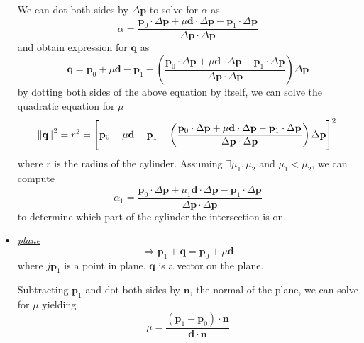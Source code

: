 \documentclass[twocolumn,landscape,10pt]{article}
\theoremstyle{definition}
\begin{document}
\begin{itemize}
        We can dot both sides by $\Delta\mathbf{p}$ to solve for $\alpha$ as
        \[
            \alpha=\frac{\mathbf{p}_0\cdot\Delta\mathbf{p}+\mu\mathbf{d}\cdot\Delta\mathbf{p}-\mathbf{p}_1\cdot\Delta\mathbf{p}}
            {\Delta\mathbf{p}\cdot\Delta\mathbf{p}}
        \]
        and obtain expression for $\mathbf{q}$ as
        \[
            \mathbf{q}=\mathbf{p}_0+\mu\mathbf{d}-\mathbf{p}_1-
            \left(\frac{\mathbf{p}_0\cdot\Delta\mathbf{p}+\mu\mathbf{d}\cdot\Delta\mathbf{p}-\mathbf{p}_1\cdot\Delta\mathbf{p}}
            {\Delta\mathbf{p}\cdot\Delta\mathbf{p}}\right)
            \Delta\mathbf{p}
        \]
        by dotting both sides of the above equation by itself,
        we can solve the quadratic equation for $\mu$
        \[
            \norm{\mathbf{q}}^2=r^2
            ={\left[\mathbf{p}_0+\mu\mathbf{d}-\mathbf{p}_1-
            \left(\frac{\mathbf{p}_0\cdot\Delta\mathbf{p}+\mu\mathbf{d}\cdot\Delta\mathbf{p}-\mathbf{p}_1\cdot\Delta\mathbf{p}}
            {\Delta\mathbf{p}\cdot\Delta\mathbf{p}}\right)
            \Delta\mathbf{p}\right]}^{2}
        \]
        where $r$ is the radius of the cylinder.
        Assuming $\exists\mu_1,\mu_2$ and $\mu_1<\mu_2$, 
        we can compute
        \[
            \alpha_1=\frac{\mathbf{p}_0\cdot\Delta\mathbf{p}+\mu_1\mathbf{d}\cdot\Delta\mathbf{p}-\mathbf{p}_1\cdot\Delta\mathbf{p}}
            {\Delta\mathbf{p}\cdot\Delta\mathbf{p}}
        \]
        to determine which part of the cylinder the intersection is on.

    \item \underline{\emph{plane}}
        \[
            \Longrightarrow
            \mathbf{p}_1+\mathbf{q}=\mathbf{p}_0+\mu\mathbf{d}
        \]
        where $j\mathbf{p}_1$ is a point in plane, $\mathbf{q}$ is a vector on
        the plane.

        Subtracting $\mathbf{p}_1$ and dot both sides by $\mathbf{n}$,
        the normal of the plane, we can solve for $\mu$ yielding
        \[
            \mu=\frac{(\mathbf{p}_1-\mathbf{p}_0)\cdot\mathbf{n}}{\mathbf{d}\cdot\mathbf{n}}
        \]
        

\end{itemize}
\end{document}
